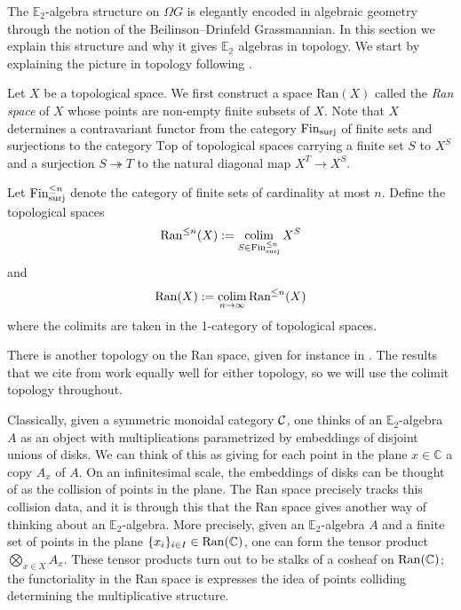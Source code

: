 The $\mathbb{E}_2$-algebra structure on $\Omega G$ is elegantly encoded in algebraic geometry through the notion of the Beilinson--Drinfeld Grassmannian.  In this section we explain this structure and why it gives $\mathbb{E_2}$ algebras in topology.  We start by explaining the picture in topology following \cite[\S 5.5]{HA}.

Let $X$ be a topological space.  We first construct a space $\mathrm{Ran}(X)$ called the \emph{Ran space} of $X$ whose points are non-empty finite subsets of $X$.  Note that $X$ determines a contravariant functor from the category $\operatorname{\mathrm{Fin}}_{\text{surj}}$ of finite sets and surjections to the category $\mathrm{Top}$ of topological spaces carrying a finite set $S$ to $X^S$ and a surjection $S \twoheadrightarrow T$ to the natural diagonal map $X^T \to X^S.$

\begin{dfn}
Let $\operatorname{\mathrm{Fin}}^{\leq n}_{\mathrm{surj}}$ denote the category of finite sets of cardinality at most $n$.  Define the topological spaces $$\operatorname{\mathrm{Ran}}^{\leq n}(X) := \operatorname*{\mathrm{colim}}_{S\in \operatorname{\mathrm{Fin}}^{\leq n}_{\mathrm{surj}}} X^S$$ and $$\operatorname{\mathrm{Ran}}(X) := \operatorname*{\mathrm{colim}}_{n\to \infty} \operatorname{\mathrm{Ran}}^{\leq n}(X)$$ where the colimits are taken in the 1-category of topological spaces.  
\end{dfn}

\begin{rmk}
There is another topology on the Ran space, given for instance in \cite{HA}.  The results that we cite from \cite{HA} work equally well for either topology, so we will use the colimit topology throughout.  
\end{rmk}

Classically, given a symmetric monoidal category $\operatorname{\mathcal{C}}$, one thinks of an $\mathbb{E}_2$-algebra $A$ as an object with multiplications parametrized by embeddings of disjoint unions of disks.  We can think of this as giving for each point in the plane $x\in \mathbb{C}$ a copy $A_x$ of $A$.  On an infinitesimal scale, the embeddings of disks can be thought of as the collision of points in the plane.  The Ran space precisely tracks this collision data, and it is through this that the Ran space gives another way of thinking about an $\mathbb{E}_2$-algebra.  More precisely, given an $\mathbb{E}_2$-algebra $A$ and a finite set of points in the plane $\{x_i\}_{i\in I} \in \operatorname{\mathrm{Ran}}(\mathbb{C})$, one can form the tensor product $\bigotimes_{x\in X} A_x.$  These tensor products turn out to be stalks of a cosheaf on $\operatorname{\mathrm{Ran}}(\mathbb{C})$; the functoriality in the Ran space is expresses the idea of points colliding determining the multiplicative structure.  

